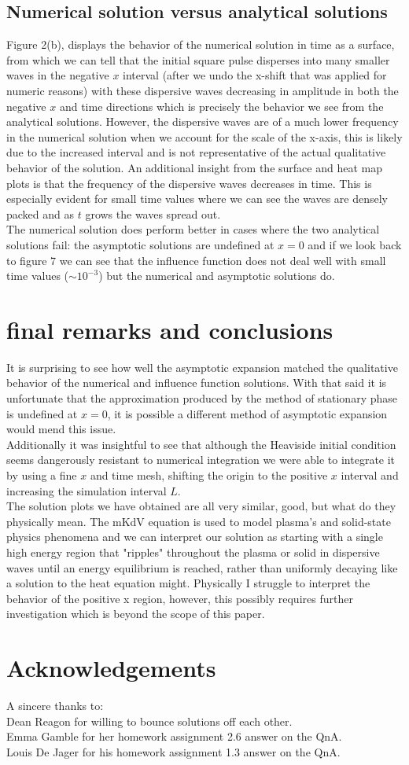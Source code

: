 \documentclass{article}
\begin{document}
\subsection{Numerical solution versus analytical solutions}
Figure 2(b), displays the behavior of the numerical solution in time as a surface, from which we can tell that the initial square pulse disperses into many smaller waves in the negative $x$ interval (after we undo the x-shift that was applied for numeric reasons) with these dispersive waves decreasing in amplitude in both the negative $x$ and time directions which is precisely the behavior we see from the analytical solutions. However, the dispersive waves are of a much lower frequency in the numerical solution when we account for the scale of the x-axis, this is likely due to the increased interval and is not representative of the actual qualitative behavior of the solution. An additional insight from the surface and heat map plots is that the frequency of the dispersive waves decreases in time. This is especially evident for small time values where we can see the waves are densely packed and as $t$ grows the waves spread out.\\
The numerical solution does perform better in cases where the two analytical solutions fail: the asymptotic solutions are undefined at $x=0$ and if we look back to figure 7 we can see that the influence function does not deal well with small time values ($\sim 10^{-3}$) but the numerical and asymptotic solutions do.
\section{final remarks and conclusions}
It is surprising to see how well the asymptotic expansion matched the qualitative behavior of the numerical and influence function solutions. With that said it is unfortunate that the approximation produced by the method of stationary phase is undefined at $x=0$, it is possible a different method of asymptotic expansion would mend this issue. \\
Additionally it was insightful to see that although the Heaviside initial condition seems dangerously resistant to numerical integration we were able to integrate it by using a fine $x$ and time mesh, shifting the origin to the positive $x$ interval and increasing the simulation interval $L$. \\
The solution plots we have obtained are all very similar, good, but what do they physically mean. The mKdV equation is used to model plasma's and solid-state physics phenomena and we can interpret our solution as starting with a single high energy region that "ripples" throughout the plasma or solid in dispersive waves until an energy equilibrium is reached, rather than uniformly decaying like a solution to the heat equation might. Physically I struggle to interpret the behavior of the positive x region, however, this possibly requires further investigation which is beyond the scope of this paper. 

\section{Acknowledgements}
A sincere thanks to:\\
Dean Reagon for willing to bounce solutions off each other.\\
Emma Gamble for her homework assignment 2.6 answer on the QnA. \\
Louis De Jager for his homework assignment 1.3 answer on the QnA.  \\
\end{document}
